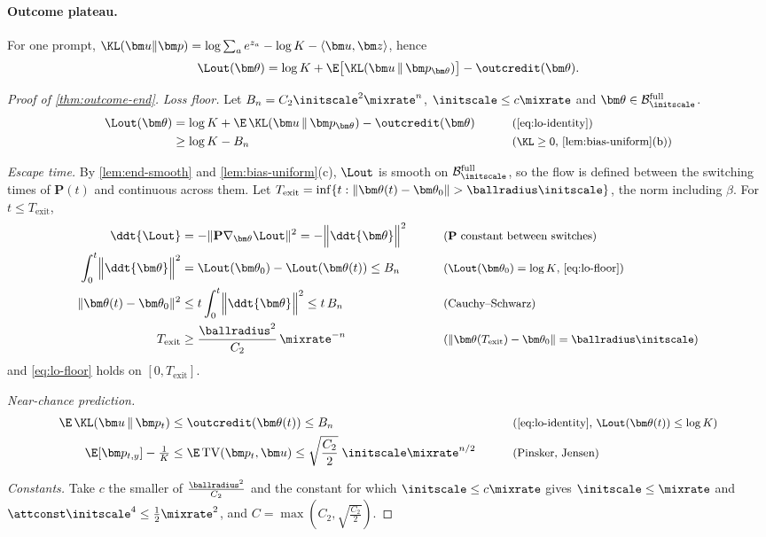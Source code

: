 \paragraph{Outcome plateau.}\label{app:end} For one prompt, $\KL(\bm u\|\bm p)=\log\sum_ae^{z_a}-\log K-\langle\bm u,\bm z\rangle$, hence
\begin{equation}
 \Lout(\bm\theta)=\log K+\E\bigl[\KL(\bm u\,\|\,\bm p_{\bm\theta})\bigr]-\outcredit(\bm\theta).
 \label{eq:lo-identity}
\end{equation}

\begin{proof}[Proof of \cref{thm:outcome-end}]
\emph{Loss floor.} Let $B_n=C_2\initscale^2\mixrate^n$, $\initscale\le c\mixrate$ and $\bm\theta\in\mathcal B^{\mathrm{full}}_{\initscale}$.
\begin{alignat}{2}
 \Lout(\bm\theta)&=\log K+\E\,\KL(\bm u\,\|\,\bm p_{\bm\theta})-\outcredit(\bm\theta) &\qquad& \why{\cref{eq:lo-identity}}\nonumber\\
 &\ge\log K-B_n && \why{$\KL\ge0$, \cref{lem:bias-uniform}(b)}\label{eq:lo-floor}
\end{alignat}

\emph{Escape time.} By \cref{lem:end-smooth} and \cref{lem:bias-uniform}(c), $\Lout$ is smooth on $\mathcal B^{\mathrm{full}}_{\initscale}$, so the flow is defined between the
switching times of $\mathbf P(t)$ and continuous across them. Let $T_{\mathrm{exit}}=\inf\{t:\|\bm\theta(t)-\bm\theta_0\|>\ballradius\initscale\}$, the norm
including $\beta$. For $t\le T_{\mathrm{exit}}$,
\begin{alignat*}{2}
 \ddt{\Lout}&=-\|\mathbf P\nabla_{\bm\theta}\Lout\|^2=-\Bigl\|\ddt{\bm\theta}\Bigr\|^2 &\qquad& \why{$\mathbf P$ constant between switches}\\
 \int_0^t\Bigl\|\ddt{\bm\theta}\Bigr\|^2&=\Lout(\bm\theta_0)-\Lout(\bm\theta(t))\le B_n && \why{$\Lout(\bm\theta_0)=\log K$, \cref{eq:lo-floor}}\\
 \|\bm\theta(t)-\bm\theta_0\|^2&\le t\int_0^t\Bigl\|\ddt{\bm\theta}\Bigr\|^2\le t\,B_n && \why{Cauchy--Schwarz}\\
 T_{\mathrm{exit}}&\ge\frac{\ballradius^2}{C_2}\,\mixrate^{-n} && \why{$\|\bm\theta(T_{\mathrm{exit}})-\bm\theta_0\|=\ballradius\initscale$}
\end{alignat*}
and \cref{eq:lo-floor} holds on $[0,T_{\mathrm{exit}}]$.

\emph{Near-chance prediction.}
\begin{alignat*}{2}
 \E\,\KL(\bm u\,\|\,\bm p_t)&\le\outcredit(\bm\theta(t))\le B_n &\qquad& \why{\cref{eq:lo-identity}, $\Lout(\bm\theta(t))\le\log K$}\\
 \E[\bm p_{t,y}]-\tfrac{1}{K}&\le\E\,\mathrm{TV}(\bm p_t,\bm u)\le\sqrt{\frac{C_2}{2}}\;\initscale\mixrate^{n/2} && \why{Pinsker, Jensen}
\end{alignat*}

\emph{Constants.} Take $c$ the smaller of $\frac{\ballradius^2}{C_2}$ and the constant for which $\initscale\le c\mixrate$ gives $\initscale\le\mixrate$ and
$\attconst\initscale^4\le\frac{1}{2}\mixrate^2$, and $C=\max(C_2,\sqrt{\frac{C_2}{2}})$.
\end{proof}
